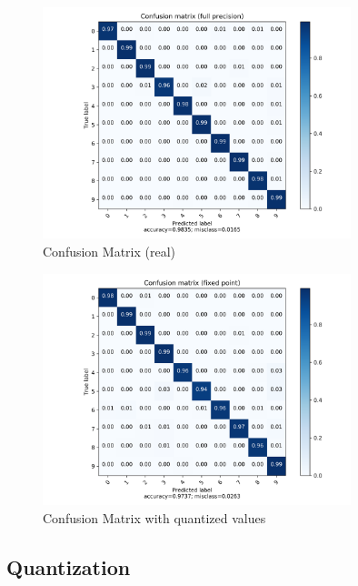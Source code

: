 \begin{figure}[htbp]
	\centering
	\includegraphics[width=0.8\textwidth]{../../net/images/cm}
	\caption{Confusion Matrix (real)}
	\label{fig:network-test-cm}
\end{figure}

\begin{figure}[htbp]
	\centering
	\includegraphics[width=0.8\textwidth]{../../net/images/qcm}
	\caption{Confusion Matrix with quantized values}
	\label{fig:network-test-qcm}
\end{figure}

\subsection{Quantization}

